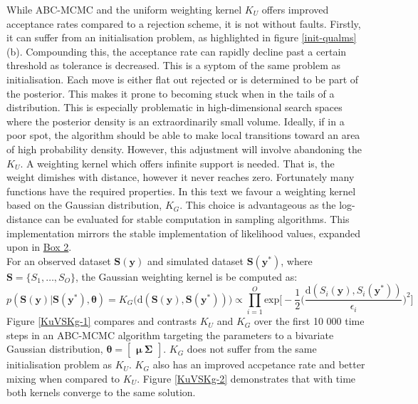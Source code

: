 While ABC-MCMC and the uniform weighting kernel $K_U$ offers improved acceptance rates compared to a rejection scheme, it is not without faults. Firstly, it can suffer from an initialisation problem, as highlighted in figure \ref{init-qualms}(b). Compounding this, the acceptance rate can rapidly decline past a certain threshold as tolerance is decreased. This is a syptom of the same problem as initialisation. Each move is either flat out rejected or is determined to be part of the posterior. This makes it prone to becoming stuck when in the tails of a distribution. This is especially problematic in high-dimensional search spaces where the posterior density is an extraordinarily small volume. Ideally, if in a poor spot, the algorithm should be able to make local transitions toward an area of high probability density. However, this adjustment will involve abandoning the $K_U$. A weighting kernel which offers infinite support is needed. That is, the weight dimishes with distance, however it never reaches zero. Fortunately many functions have the required properties. In this text we favour a  weighting kernel based on the Gaussian distribution, $K_G$. This choice is advantageous as the log-distance can be evaluated for stable computation in sampling algorithms. This implementation mirrors the stable implementation of likelihood values, expanded upon in \hyperref[Box2]{Box 2}.\\

For an observed dataset $\bm{S}(\bm{y})$ and simulated dataset $\bm{S}(\bm{y^*})$, where $\bm{S} = \{S_1,\dots,S_O\}$, the Gaussian weighting kernel is be computed as:
\begin{equation}
p(\bm{S}(\bm{y})|\bm{S}(\bm{y^*}),\bm{\theta}) = K_G\big(\text{d}(\bm{S}(\bm{y}),\bm{S}(\bm{y^*}))\big) \propto \prod_{i = 1}^{O} \text{exp}\Big[-\frac{1}{2}\Big(\frac{\text{d}(S_i(\bm{y}),S_i(\bm{y^*}))}{\epsilon_i}\Big)^2\Big]
\end{equation}
Figure \ref{KuVSKg-1} compares and contrasts $K_U$ and $K_G$ over the first 10 000 time steps in an ABC-MCMC algorithm targeting the parameters to a bivariate Gaussian distribution, $\bm{\theta} = \begin{bmatrix}
\bm{\mu}\ \bm{\Sigma}
\end{bmatrix}$. $K_G$ does not suffer from the same initialisation problem as $K_U$. $K_G$ also has an improved accpetance rate and better mixing when compared to $K_U$. Figure \ref{KuVSKg-2} demonstrates that with time both kernels converge to the same solution.\\

